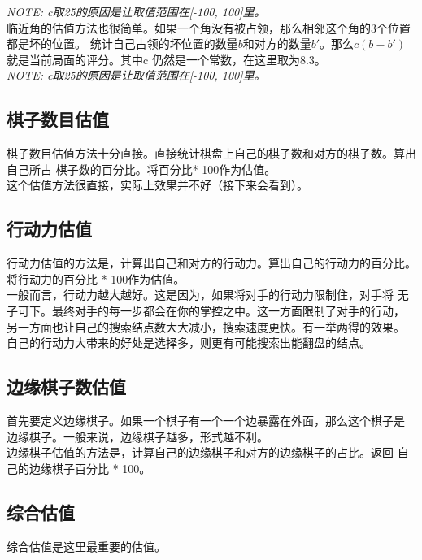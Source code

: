 \documentclass[a4paper]{article}
\begin{document}
\emph{NOTE: c取25的原因是让取值范围在[-100, 100]里。}\\

临近角的估值方法也很简单。如果一个角没有被占领，那么相邻这个角的3个位置都是坏的位置。
统计自己占领的坏位置的数量$b$和对方的数量$b'$。那么$c(b - b')$就是当前局面的评分。其中c
仍然是一个常数，在这里取为8.3。\\

\emph{NOTE: c取25的原因是让取值范围在[-100, 100]里。}\\

\subsection{棋子数目估值}
棋子数目估值方法十分直接。直接统计棋盘上自己的棋子数和对方的棋子数。算出自己所占
棋子数的百分比。将百分比* 100作为估值。\\

这个估值方法很直接，实际上效果并不好（接下来会看到）。\\

\subsection{行动力估值}
行动力估值的方法是，计算出自己和对方的行动力。算出自己的行动力的百分比。
将行动力的百分比 * 100作为估值。 \\

一般而言，行动力越大越好。这是因为，如果将对手的行动力限制住，对手将
无子可下。最终对手的每一步都会在你的掌控之中。这一方面限制了对手的行动，
另一方面也让自己的搜索结点数大大减小，搜索速度更快。有一举两得的效果。\\

自己的行动力大带来的好处是选择多，则更有可能搜索出能翻盘的结点。

\subsection{边缘棋子数估值}
首先要定义边缘棋子。如果一个棋子有一个一个边暴露在外面，那么这个棋子是
边缘棋子。一般来说，边缘棋子越多，形式越不利。\\

边缘棋子估值的方法是，计算自己的边缘棋子和对方的边缘棋子的占比。返回
自己的边缘棋子百分比 * 100。

\subsection{综合估值}\label{subsec:sum}
综合估值是这里最重要的估值。\\
\end{document}
